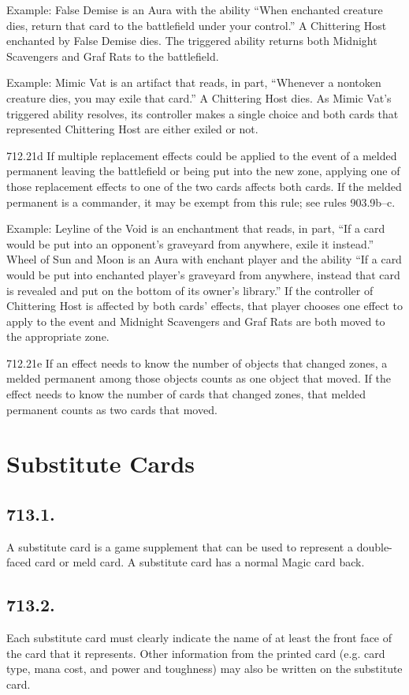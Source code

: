 Example: False Demise is an Aura with the ability “When enchanted creature dies, return that card to the battlefield under your control.” A Chittering Host enchanted by False Demise dies. The triggered ability returns both Midnight Scavengers and Graf Rats to the battlefield.

Example: Mimic Vat is an artifact that reads, in part, “Whenever a nontoken creature dies, you may exile that card.” A Chittering Host dies. As Mimic Vat’s triggered ability resolves, its controller makes a single choice and both cards that represented Chittering Host are either exiled or not.

712.21d If multiple replacement effects could be applied to the event of a melded permanent leaving the battlefield or being put into the new zone, applying one of those replacement effects to one of the two cards affects both cards. If the melded permanent is a commander, it may be exempt from this rule; see rules 903.9b–c.

Example: Leyline of the Void is an enchantment that reads, in part, “If a card would be put into an opponent’s graveyard from anywhere, exile it instead.” Wheel of Sun and Moon is an Aura with enchant player and the ability “If a card would be put into enchanted player’s graveyard from anywhere, instead that card is revealed and put on the bottom of its owner’s library.” If the controller of Chittering Host is affected by both cards’ effects, that player chooses one effect to apply to the event and Midnight Scavengers and Graf Rats are both moved to the appropriate zone.

712.21e If an effect needs to know the number of objects that changed zones, a melded permanent among those objects counts as one object that moved. If the effect needs to know the number of cards that changed zones, that melded permanent counts as two cards that moved.

\section{Substitute Cards}
\subsection*{713.1.}
A substitute card is a game supplement that can be used to represent a double-faced card or meld card. A substitute card has a normal Magic card back.

\subsection*{713.2.}
Each substitute card must clearly indicate the name of at least the front face of the card that it represents. Other information from the printed card (e.g. card type, mana cost, and power and toughness) may also be written on the substitute card.

